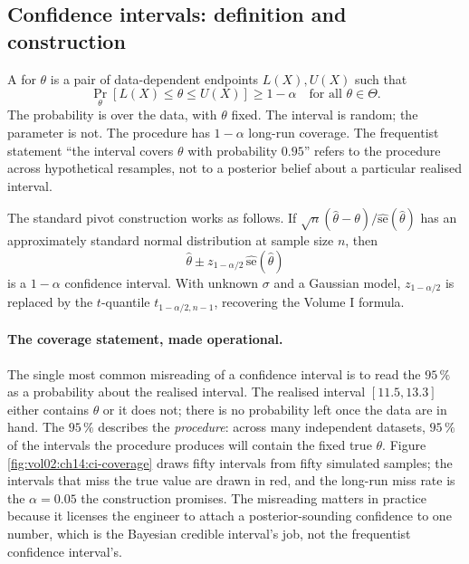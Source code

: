 \subsection{Confidence intervals: definition and construction}

A  for $\theta$ is a pair of
data-dependent endpoints $L(X), U(X)$ such that
\[
\Pr_{\theta}\!\left[L(X) \leq \theta \leq U(X)\right] \geq 1-\alpha
\quad \text{for all } \theta \in \Theta.
\]
The probability is over the data, with $\theta$ fixed. The interval
is random; the parameter is not. The procedure has $1-\alpha$
long-run coverage. The frequentist statement ``the interval covers
$\theta$ with probability $0.95$'' refers to the procedure across
hypothetical resamples, not to a posterior belief about a particular
realised interval.

The standard pivot construction works as follows. If
$\sqrt{n}(\hat{\theta} - \theta)/\widehat{\mathrm{se}}(\hat{\theta})$
has an approximately standard normal distribution at sample size
$n$, then
\[
\hat{\theta} \pm z_{1-\alpha/2}\,\widehat{\mathrm{se}}(\hat{\theta})
\]
is a $1-\alpha$ confidence interval. With unknown $\sigma$ and a
Gaussian model, $z_{1-\alpha/2}$ is replaced by the $t$-quantile
$t_{1-\alpha/2,n-1}$, recovering the Volume I formula.

\paragraph{The coverage statement, made operational.} The single
most common misreading of a confidence interval is to read the
$95\,\%$ as a probability about the realised interval. The realised
interval $[11.5, 13.3]$ either contains $\theta$ or it does not;
there is no probability left once the data are in hand. The
$95\,\%$ describes the \emph{procedure}: across many independent
datasets, $95\,\%$ of the intervals the procedure produces will
contain the fixed true $\theta$. Figure
\ref{fig:vol02:ch14:ci-coverage} draws fifty intervals from fifty
simulated samples; the intervals that miss the true value are
drawn in red, and the long-run miss rate is the $\alpha = 0.05$ the
construction promises. The misreading matters in practice because
it licenses the engineer to attach a posterior-sounding confidence
to one number, which is the Bayesian credible interval's job, not
the frequentist confidence interval's.



